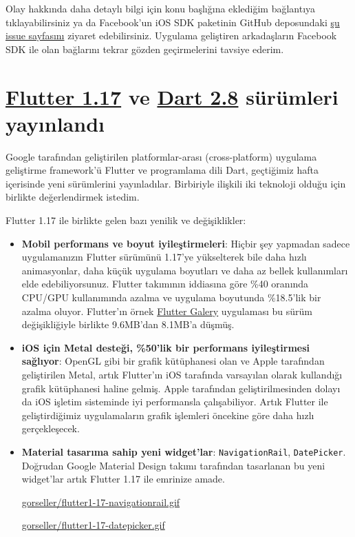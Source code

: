 \documentclass[11pt]{article}
\begin{document}
Olay hakkında daha detaylı bilgi için konu başlığına eklediğim bağlantıya
tıklayabilirsiniz ya da Facebook'un iOS SDK paketinin GitHub deposundaki \href{https://github.com/facebook/facebook-ios-sdk/issues/1374}{şu
issue sayfasını} ziyaret edebilirsiniz. Uygulama geliştiren arkadaşların
Facebook SDK ile olan bağlarını tekrar gözden geçirmelerini tavsiye ederim.
\section{\href{https://medium.com/flutter/announcing-flutter-1-17-4182d8af7f8e}{Flutter 1.17} ve \href{https://medium.com/dartlang/announcing-dart-2-8-7750918db0a}{Dart 2.8} sürümleri yayınlandı}
\label{sec:org46d2592}
Google tarafından geliştirilen platformlar-arası (cross-platform) uygulama
geliştirme framework'ü Flutter ve programlama dili Dart, geçtiğimiz hafta
içerisinde yeni sürümlerini yayınladılar. Birbiriyle ilişkili iki teknoloji
olduğu için birlikte değerlendirmek istedim.

Flutter 1.17 ile birlikte gelen bazı yenilik ve değişiklikler:
\begin{itemize}
\item \textbf{Mobil performans ve boyut iyileştirmeleri}: Hiçbir şey yapmadan sadece
uygulamanızın Flutter sürümünü 1.17'ye yükselterek bile daha hızlı
animasyonlar, daha küçük uygulama boyutları ve daha az bellek kullanımları
elde edebiliyorsunuz. Flutter takımının iddiasına göre \%40 oranında CPU/GPU
kullanımında azalma ve uygulama boyutunda \%18.5'lik bir azalma oluyor.
Flutter'ın örnek \href{https://github.com/flutter/gallery}{Flutter Galery} uygulaması bu sürüm değişikliğiyle birlikte
9.6MB'dan 8.1MB'a düşmüş.
\item \textbf{iOS için Metal desteği, \%50'lik bir performans iyileştirmesi sağlıyor}:
OpenGL gibi bir grafik kütüphanesi olan ve Apple tarafından geliştirilen
Metal, artık Flutter'ın iOS tarafında varsayılan olarak kullandığı grafik
kütüphanesi haline gelmiş. Apple tarafından geliştirilmesinden dolayı da iOS
işletim sisteminde iyi performansla çalışabiliyor. Artık Flutter ile
geliştirdiğimiz uygulamaların grafik işlemleri öncekine göre daha hızlı
gerçekleşecek.
\item \textbf{Material tasarıma sahip yeni widget'lar}: \texttt{NavigationRail}, \texttt{DatePicker}.
Doğrudan Google Material Design takımı tarafından tasarlanan bu yeni
widget'lar artık Flutter 1.17 ile emrinize amade.

\url{gorseller/flutter1-17-navigationrail.gif}

\url{gorseller/flutter1-17-datepicker.gif}
\end{itemize}
\end{document}
